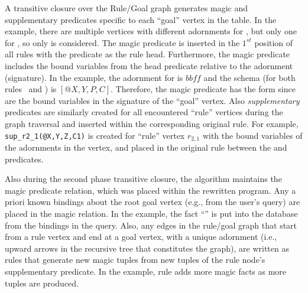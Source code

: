 A transitive closure over the Rule/Goal graph generates magic and supplementary
predicates specific to each ``goal'' vertex in the  table.  In
the example, there are multiple vertices with different adornments for
, but only one for , so only  is considered.  The
 magic predicate is inserted in the $1^{st}$ position of all rules
with the  predicate as the rule head.  Furthermore, the 
magic predicate includes the bound variables from the  head predicate
relative to the  adornment (signature).  In the example, the adornment
for  is $bbff$ and the schema (for both rules~ and ) is
$[@X,Y,P,C]$.  Therefore, the  magic predicate has the form
 since  are the bound variables in the
signature of the ``goal'' vertex.  Also \emph{supplementary} predicates are
similarly created for all encountered ``rule'' vertices during the graph
traversal and inserted within the corresponding original rule.  For example,
{\tt sup\_r2\_1(@X,Y,Z,C1)} is created for ``rule'' vertex $r_{2,1}$ with the
bound variables of the adornments in the vertex, and placed in the original
rule  between the  and  predicates.

Also during the second phase transitive closure, the algorithm maintains the
magic predicate relation, which was placed within the rewritten program.  Any 
a priori known bindings about the root goal vertex
(e.g., from the user's query) are placed in the magic relation. In the example, the 
fact ``'' is put into the
database from the bindings in the  query.  Also, any edges in
the rule/goal graph that start from a rule vertex and end at a goal vertex, with a
unique adornment (i.e., upward arrows in the recursive tree that constitutes the graph), are written as
rules that generate new magic tuples from new tuples of the rule
node's supplementary predicate. In the example, rule 
adds more magic facts as more  tuples are produced.


